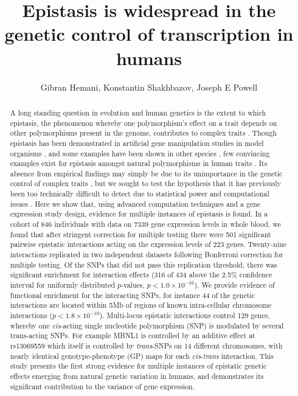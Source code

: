 \documentclass{article}
\title{Epistasis is widespread in the genetic control of transcription in humans}
\date{}
\author{Gibran Hemani, Konstantin Shakhbazov, Joseph E Powell}
\begin{document}
\maketitle


\begin{abstract}
A long standing question in evolution and human genetics is the extent to which epistasis, the phenomenon whereby one polymorphism's effect on a trait depends on other polymorphisms present in the genome, contributes to complex traits \cite{Carlborg2004, Hill2008a, Crow2010}. Though epistasis has been demonstrated in artificial gene manipulation studies in model organisms \cite{Costanzo2010, Bloom2013}, and some examples have been shown in other species \cite{Carlborg2006}, few convincing examples exist for epistasis amongst natural polymorphisms in human traits \cite{Strange2010, Evans2011}. Its absence from empirical findings may simply be due to its unimportance in the genetic control of complex traits \cite{Hill2008a, Crow2010}, but we sought to test the hypothesis that it has previously been too technically difficult to detect due to statistical power and computational issues \cite{Cordell2009}. Here we show that, using advanced computation techniques \cite{Hemani2011} and a gene expression study design, evidence for multiple instances of epistasis is found. In a cohort of 846 individuals with data on 7339 gene expression levels in whole blood, we found that after stringent correction for multiple testing there were 501 significant pairwise epistatic interactions acting on the expression levels of 223 genes. Twenty-nine interactions replicated in two independent datasets \cite{Metspalu2004, Fehrmann2011} following Bonferroni correction for multiple testing. Of the SNPs that did not pass this replication threshold, there was significant enrichment for interaction effects (316 of 434 above the 2.5\% confidence interval for uniformly distributed $p$-values, $p < 1.0 \times 10^{-16}$). We provide evidence of functional enrichment for the interacting SNPs, for instance 44 of the genetic interactions are located within 5Mb of regions of known intra-cellular chromosome interactions \cite{LiebermanAiden2009} ($p < 1.8 \times 10^{-10}$). Multi-locus epistatic interactions control 129 genes, whereby one \emph{cis}-acting single nucleotide polymorphism (SNP) is modulated by several trans-acting SNPs. For example MBNL1 is controlled by an additive effect at rs13069559 which itself is controlled by \emph{trans}-SNPs on 14 different chromosomes, with nearly identical genotype-phenotype (GP) maps for each \emph{cis}-\emph{trans} interaction. This study presents the first strong evidence for multiple instances of epistatic genetic effects emerging from natural genetic variation in humans, and demonstrates its significant contribution to the variance of gene expression.
\end{abstract}
\end{document}
